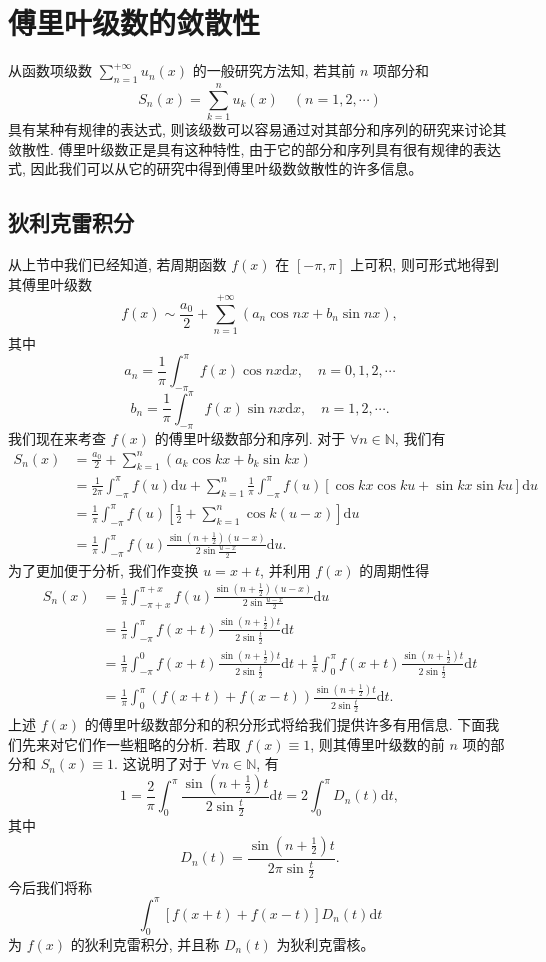 \documentclass[UTF8,12pt,a4paper,fontset=fandol]{ctexart}
\begin{document}
\section{傅里叶级数的敛散性}

从函数项级数 $\sum\limits_{n=1}^{+\infty}u_n(x)$ 的一般研究方法知, 若其前 $n$ 项部分和
\[
  S_n(x)=\sum_{k=1}^n u_k(x)\quad(n=1,2,\cdots)
\]
具有某种有规律的表达式, 则该级数可以容易通过对其部分和序列的研究来讨论其敛散性. 傅里叶级数正是具有这种特性, 由于它的部分和序列具有很有规律的表达式, 因此我们可以从它的研究中得到傅里叶级数敛散性的许多信息。

\subsection{狄利克雷积分}

从上节中我们已经知道, 若周期函数 $f(x)$ 在 $[-\pi,\pi]$ 上可积, 则可形式地得到其傅里叶级数
\[
  f(x)\sim\frac{a_0}{2}+\sum_{n=1}^{+\infty}(a_n\cos nx+b_n\sin nx),
\]
其中
\[
  a_n=\frac1\pi\int_{-\pi}^{\pi}f(x)\cos nx\mathrm dx,\quad n=0,1,2,\cdots
\]
\[
  b_n=\frac1\pi\int_{-\pi}^{\pi}f(x)\sin nx\mathrm dx,\quad n=1,2,\cdots.
\]
我们现在来考查 $f(x)$ 的傅里叶级数部分和序列. 对于 $\forall n\in\mathbb N$, 我们有
\[
\begin{aligned}
  S_n(x)
  &=\frac{a_0}{2}+\sum_{k=1}^n(a_k\cos kx+b_k\sin kx)\\
  &=\frac1{2\pi}\int_{-\pi}^{\pi}f(u)\mathrm du
    +\sum_{k=1}^n\frac1\pi\int_{-\pi}^{\pi}f(u)[\cos kx\cos ku+\sin kx\sin ku]\mathrm du\\
  &=\frac1\pi\int_{-\pi}^{\pi}f(u)\left[\frac12+\sum_{k=1}^n\cos k(u-x)\right]\mathrm du\\
  &=\frac1\pi\int_{-\pi}^{\pi}f(u)\frac{\sin\left(n+\frac12\right)(u-x)}{2\sin\frac{u-x}{2}}\mathrm du.
\end{aligned}
\]
为了更加便于分析, 我们作变换 $u=x+t$, 并利用 $f(x)$ 的周期性得
\[
\begin{aligned}
  S_n(x)
  &=\frac1\pi\int_{-\pi+x}^{\pi+x}
    f(u)\frac{\sin\left(n+\frac12\right)(u-x)}{2\sin\frac{u-x}{2}}\mathrm du\\
  &=\frac1\pi\int_{-\pi}^{\pi}
    f(x+t)\frac{\sin\left(n+\frac12\right)t}{2\sin\frac t2}\mathrm dt\\
  &=\frac1\pi\int_{-\pi}^{0}
    f(x+t)\frac{\sin\left(n+\frac12\right)t}{2\sin\frac t2}\mathrm dt
    +\frac1\pi\int_0^\pi
    f(x+t)\frac{\sin\left(n+\frac12\right)t}{2\sin\frac t2}\mathrm dt\\
  &=\frac1\pi\int_0^\pi
    (f(x+t)+f(x-t))\frac{\sin\left(n+\frac12\right)t}{2\sin\frac t2}\mathrm dt.
\end{aligned}
\]
上述 $f(x)$ 的傅里叶级数部分和的积分形式将给我们提供许多有用信息. 下面我们先来对它们作一些粗略的分析. 若取 $f(x)\equiv1$, 则其傅里叶级数的前 $n$ 项的部分和 $S_n(x)\equiv1$. 这说明了对于 $\forall n\in\mathbb N$, 有
\[
  1=\frac2\pi\int_0^\pi\frac{\sin\left(n+\frac12\right)t}{2\sin\frac t2}\mathrm dt
  =2\int_0^\pi D_n(t)\mathrm dt,
\]
其中
\[
  D_n(t)=\frac{\sin\left(n+\frac12\right)t}{2\pi\sin\frac t2}.
\]
今后我们将称
\[
  \int_0^\pi [f(x+t)+f(x-t)]D_n(t)\mathrm dt
\]
为 $f(x)$ 的狄利克雷积分, 并且称 $D_n(t)$ 为狄利克雷核。
\end{document}
